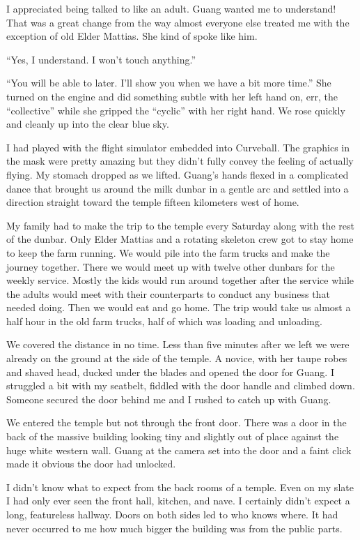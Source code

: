 I appreciated being talked to like an adult. Guang wanted me to understand! That was a great change from the way almost everyone else treated me with the exception of old Elder Mattias. She kind of spoke like him.

``Yes, I understand. I won't touch anything.''

``You will be able to later. I'll show you when we have a bit more time.'' She turned on the engine and did something subtle with her left hand on, err, the ``collective'' while she gripped the ``cyclic'' with her right hand. We rose quickly and cleanly up into the clear blue sky.

I had played with the flight simulator embedded into Curveball. The graphics in the mask were pretty amazing but they didn't fully convey the feeling of actually flying. My stomach dropped as we lifted. Guang's hands flexed in a complicated dance that brought us around the milk dunbar in a gentle arc and settled into a direction straight toward the temple fifteen kilometers west of home.

My family had to make the trip to the temple every Saturday along with the rest of the dunbar. Only Elder Mattias and a rotating skeleton crew got to stay home to keep the farm running. We would pile into the farm trucks and make the journey together. There we would meet up with twelve other dunbars for the weekly service. Mostly the kids would run around together after the service while the adults would meet with their counterparts to conduct any business that needed doing. Then we would eat and go home. The trip would take us almost a half hour in the old farm trucks, half of which was loading and unloading.

We covered the distance in no time. Less than five minutes after we left we were already on the ground at the side of the temple. A novice, with her taupe robes and shaved head, ducked under the blades and opened the door for Guang. I struggled a bit with my seatbelt, fiddled with the door handle and climbed down. Someone secured the door behind me and I rushed to catch up with Guang.

We entered the temple but not through the front door. There was a door in the back of the massive building looking tiny and slightly out of place against the huge white western wall. Guang at the camera set into the door and a faint click made it obvious the door had unlocked.

I didn't know what to expect from the back rooms of a temple. Even on my slate I had only ever seen the front hall, kitchen, and nave. I certainly didn't expect a long, featureless hallway. Doors on both sides led to who knows where. It had never occurred to me how much bigger the building was from the public parts.

